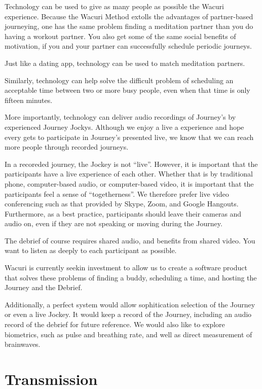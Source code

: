 \documentclass[12pt]{book}
\begin{document}
Technology can be used to give as many people as possible the Wacuri experience.
Because the Wacuri Method extolls the advantages of partner-based journeying,
one has the same problem finding a meditation partner than you do having a
workout partner. You also get some of the same social benefits of motivation,
if you and your partner can successfully schedule periodic journeys.

Just like a dating app, technology can be used to match meditation partners.

Similarly, technology can help solve the difficult problem of scheduling an
acceptable time between two or more busy people, even when that time is only fifteen minutes.

More importantly, technology can deliver audio recordings of Journey's by
experienced Journey Jockys. Although we enjoy a live a experience and hope
every gets to participate in Journey's presented live, we know that we
can reach more people through recorded journeys.

In a recoreded journey, the Jockey is not ``live''. However, it is
important that the participants have a live experience of each other.
Whether that is by traditional phone, computer-based audio, or computer-based
video, it is important that the participants feel a sense of ``togetherness''.
We therefore prefer live video conferencing such as that provided by Skype,
Zoom, and Google Hangouts. Furthermore, as a best practice, participants
should leave their cameras and audio on, even if they are not speaking or
moving during the Journey.

The debrief of course requires shared audio, and benefits from shared video.
You want to listen as deeply to each participant as possible.

Wacuri is currently seekin investment to allow us to create a software
product that solves these problems of finding a buddy, scheduling a time,
and hosting the Journey and the Debrief.

Additionally, a perfect system would allow sophitication selection of
the Journey or even a live Jockey. It would keep a record of the Journey,
including an audio record of the debrief for future reference. We would
also like to explore biometrics, such as pulse and breathing rate, and
well as direct measurement of brainwaves.


\chapter{Transmission}
\end{document}
